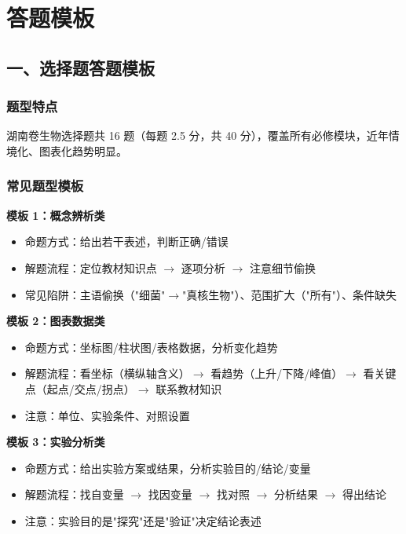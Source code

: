 \section{答题模板}

\subsection{一、选择题答题模板}

\subsubsection{题型特点}

湖南卷生物选择题共 16 题（每题 2.5 分，共 40 分），覆盖所有必修模块，近年情境化、图表化趋势明显。

\subsubsection{常见题型模板}

\textbf{模板 1：概念辨析类}

\begin{itemize}
  \item 命题方式：给出若干表述，判断正确/错误
  \item 解题流程：定位教材知识点 $\to$ 逐项分析 $\to$ 注意细节偷换
  \item 常见陷阱：主语偷换（"细菌"$\to$"真核生物"）、范围扩大（"所有"）、条件缺失
\end{itemize}

\textbf{模板 2：图表数据类}

\begin{itemize}
  \item 命题方式：坐标图/柱状图/表格数据，分析变化趋势
  \item 解题流程：看坐标（横纵轴含义）$\to$ 看趋势（上升/下降/峰值）$\to$ 看关键点（起点/交点/拐点）$\to$ 联系教材知识
  \item 注意：单位、实验条件、对照设置
\end{itemize}

\textbf{模板 3：实验分析类}

\begin{itemize}
  \item 命题方式：给出实验方案或结果，分析实验目的/结论/变量
  \item 解题流程：找自变量 $\to$ 找因变量 $\to$ 找对照 $\to$ 分析结果 $\to$ 得出结论
  \item 注意：实验目的是"探究"还是"验证"决定结论表述
\end{itemize}

